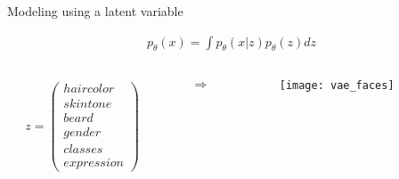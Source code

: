 \begin{frame}{Modeling using a latent variable}

  \begin{align*}
    p_{\theta}(x) = \int p_{\theta}(x|z)p_{\theta}(z) dz
  \end{align*}

  \begin{columns}
    \hspace{2cm}
    \begin{column}{0.3\textwidth}
      \begin{align*}
        z = \begin{pmatrix}
          haircolor \\
          skin tone \\
          beard \\
          gender \\
          classes \\
          expression
        \end{pmatrix}
      \end{align*}
    \end{column}
    \begin{column}{0.1\textwidth}
      \begin{align*}
        \Rightarrow
      \end{align*}
    \end{column}
    \begin{column}{0.4\textwidth}
      \begin{figure}
        \texttt{[image: vae\_faces]}
      \end{figure}
    \end{column}
    \hspace{2cm}
  \end{columns}


\end{frame}



